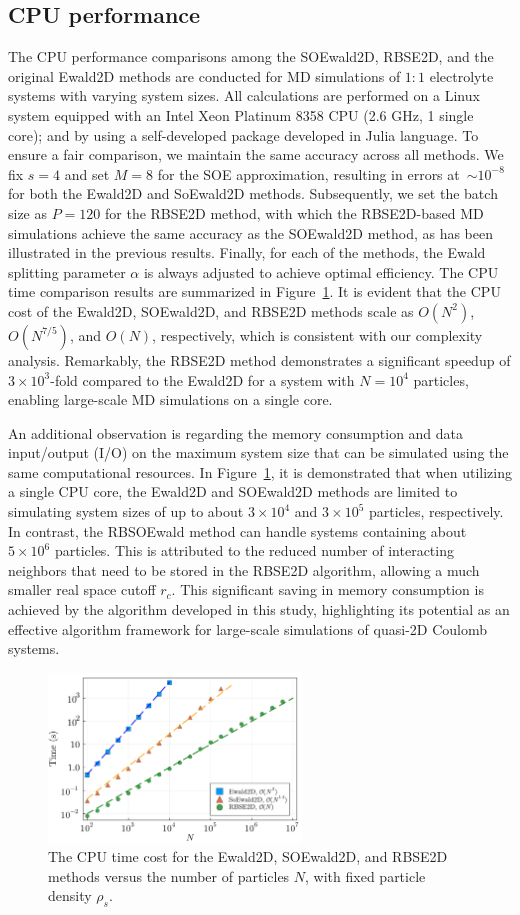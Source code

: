 \subsection{CPU performance}
The CPU performance comparisons among the SOEwald2D, RBSE2D, and the original Ewald2D methods are conducted for MD simulations of $1:1$ electrolyte systems with varying system sizes. 
All calculations are performed on a Linux system equipped with an Intel Xeon Platinum 8358 CPU (2.6 GHz, 1 single core); and by using a self-developed package developed in Julia language. 
To ensure a fair comparison, we maintain the same accuracy across all methods. We fix $s=4$ and set $M=8$ for the SOE approximation, resulting in errors at~$\sim10^{-8}$ for both the Ewald2D and SoEwald2D methods. %
Subsequently, we set the batch size as $P=120$ for the RBSE2D method, with which the RBSE2D-based MD simulations achieve the same accuracy as the SOEwald2D method, as has been illustrated in the previous results.
Finally, for each of the methods, the Ewald splitting parameter $\alpha$ is always adjusted to achieve optimal efficiency.
The CPU time comparison results are summarized in Figure~\ref{fig:times_compare}. 
It is evident that the CPU cost of the Ewald2D, SOEwald2D, and RBSE2D methods scale as $O(N^2)$, $O(N^{7/5})$, and $O(N)$, respectively, which is consistent with our complexity analysis. 
Remarkably, the RBSE2D method demonstrates a significant speedup of $3\times 10^3$-fold compared to the Ewald2D for a system with $N=10^{4}$ particles, enabling large-scale MD simulations on a single core.

An additional observation is regarding the memory consumption and data input/output (I/O) on the maximum system size that can be simulated using the same computational resources. 
In Figure~\ref{fig:times_compare}, it is demonstrated that when utilizing a single CPU core, the Ewald2D and SOEwald2D methods are limited to simulating system sizes of up to about $3 \times 10^4$ and $3 \times 10^5$ particles, respectively. 
In contrast, the RBSOEwald method can handle systems containing about $5 \times 10^6$ particles. 
This is attributed to the reduced number of interacting neighbors that need to be stored in the RBSE2D algorithm, allowing a much smaller real space cutoff $r_c$. 
This significant saving in memory consumption is achieved by the algorithm developed in this study, highlighting its potential as an effective algorithm framework for large-scale simulations of quasi-2D Coulomb systems.

\begin{figure}[ht]
	\centering
	\includegraphics[width=0.6\textwidth]{figs/times_compare.pdf} 
	\caption{
		The CPU time cost for the Ewald2D, SOEwald2D, and RBSE2D methods versus the number of particles $N$, with fixed particle density $\rho_s$. 
	}
	\label{fig:times_compare}
\end{figure}
